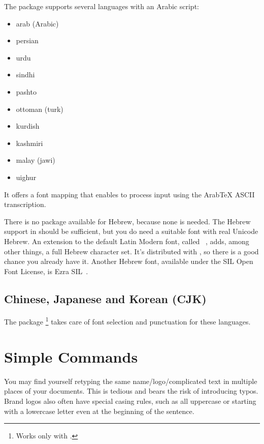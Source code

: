 The  package supports several languages with
an Arabic script:
\begin{itemize}
  \item arab (Arabic)
  \item persian
  \item urdu
  \item sindhi
  \item pashto
  \item ottoman (turk)
  \item kurdish
  \item kashmiri
  \item malay (jawi)
  \item uighur
\end{itemize}
It offers a font mapping that enables  to process input
using the Arab\TeX{} ASCII transcription.

There is no package available for Hebrew, because none is needed.
The Hebrew support in  should be sufficient, but you do need a
suitable font with real Unicode Hebrew. An extension to the default Latin
Modern font, called
~\cite{font:NewComputerModern}, adds, among
other things, a full Hebrew character set. It's distributed with \TeXLive, so
there is a good chance you already have it. Another Hebrew font, available under
the SIL Open Font License, is Ezra SIL~\cite{font:ezrasil}.

\subsection{Chinese, Japanese and Korean (CJK)}%

The package \footnote{Works only with
  .} takes care of font selection and
punctuation for these languages.

\section{Simple Commands}\label{sec:simple_commands}

You may find yourself retyping the same name\slash{}logo\slash{}complicated text
in multiple places of your documents. This is tedious and bears the risk of
introducing typos. Brand logos also often have special casing rules, such as
all uppercase or starting with a lowercase letter even at the beginning of the
sentence.

